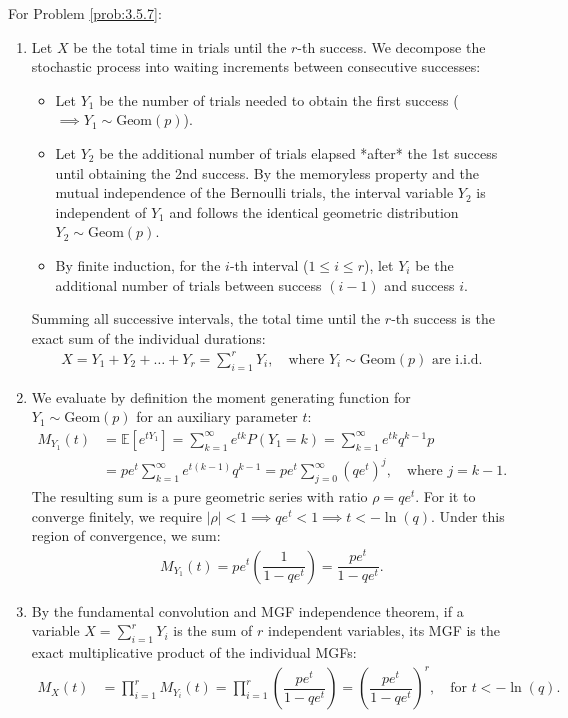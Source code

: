 \begin{solucion}
	\label{sol:3.5.7}
	For Problem \ref{prob:3.5.7}:
	\begin{enumerate}
		\item Let $X$ be the total time in trials until the $r$-th success. We decompose the stochastic process into waiting increments between consecutive successes:
		\begin{itemize}
			\item Let $Y_1$ be the number of trials needed to obtain the first success ($\implies Y_1 \sim \text{Geom}(p)$).
			\item Let $Y_2$ be the additional number of trials elapsed *after* the 1st success until obtaining the 2nd success. By the memoryless property and the mutual independence of the Bernoulli trials, the interval variable $Y_2$ is independent of $Y_1$ and follows the identical geometric distribution $Y_2 \sim \text{Geom}(p)$.
			\item By finite induction, for the $i$-th interval ($1 \le i \le r$), let $Y_i$ be the additional number of trials between success $(i-1)$ and success $i$.
		\end{itemize}
		Summing all successive intervals, the total time until the $r$-th success is the exact sum of the individual durations:
		\begin{align*}
			X = Y_1 + Y_2 + \dots + Y_r = \sum_{i=1}^r Y_i, \quad \text{where } Y_i \sim \text{Geom}(p) \text{ are i.i.d.}
		\end{align*}
		\item We evaluate by definition the moment generating function for $Y_1 \sim \text{Geom}(p)$ for an auxiliary parameter $t$:
		\begin{align*}
			M_{Y_1}(t) &= \mathbb{E}[e^{t Y_1}] = \sum_{k=1}^{\infty} e^{t k} P(Y_1 = k) = \sum_{k=1}^{\infty} e^{t k} q^{k-1} p \\
			&= p e^t \sum_{k=1}^{\infty} e^{t(k-1)} q^{k-1} = p e^t \sum_{j=0}^{\infty} (q e^t)^j, \quad \text{where } j = k-1.
		\end{align*}
		The resulting sum is a pure geometric series with ratio $\rho = q e^t$. For it to converge finitely, we require $|\rho| < 1 \implies q e^t < 1 \implies t < -\ln(q)$. Under this region of convergence, we sum:
		\begin{align*}
			M_{Y_1}(t) = p e^t \left(\dfrac{1}{1 - q e^t}\right) = \dfrac{p e^t}{1 - q e^t}.
		\end{align*}
		\item By the fundamental convolution and MGF independence theorem, if a variable $X = \sum_{i=1}^r Y_i$ is the sum of $r$ independent variables, its MGF is the exact multiplicative product of the individual MGFs:
		\begin{align*}
			M_X(t) &= \prod_{i=1}^r M_{Y_i}(t) = \prod_{i=1}^r \left(\dfrac{p e^t}{1 - q e^t}\right) = \left(\dfrac{p e^t}{1 - q e^t}\right)^r, \quad \text{for } t < -\ln(q).
		\end{align*}
	\end{enumerate}
\end{solucion}

